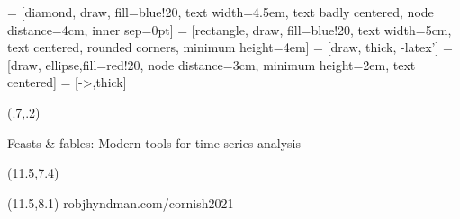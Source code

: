 
\usepackage{bm,booktabs,animate,ragged2e,multicol,microtype,hyperref,alltt}

\fontsize{13}{15}\sf
\usepackage[scale=0.85]{sourcecodepro}
\usepackage{fontawesome}

\usetikzlibrary{trees,shapes,arrows,matrix}
 = [diamond, draw, fill=blue!20,
    text width=4.5em, text badly centered, node distance=4cm, inner sep=0pt]
 = [rectangle, draw, fill=blue!20,
    text width=5cm, text centered, rounded corners, minimum height=4em]
 = [draw, thick, -latex']
 = [draw, ellipse,fill=red!20, node distance=3cm,
    minimum height=2em, text centered]
 = [->,thick]

\graphicspath{{figs/}}

{
\begin{textblock}{12.5}(.7,.2)\fontsize{18}{20}\sf
{\color{MonashBlue}\raggedright{}\par Feasts \& fables: Modern tools for time series analysis}
\end{textblock}
\begin{textblock}{7.5}(11.5,7.4)
{\fontsize{15}{15}\sf\color[RGB]{45,27,15}\bfseries\raggedright{\insertauthor}}
\end{textblock}
\begin{textblock}{7.5}(11.5,8.1)
{\fontsize{9}{9}\sf\color[RGB]{45,27,15}robjhyndman.com/cornish2021}
\end{textblock}
}

\def\E{\text{E}}
\def\V{\text{Var}}
\def\bY{\bm{y}}
\def\by{\bm{y}}
\def\bS{\bm{S}}
\def\bG{\bm{G}}
\def\bW{\bm{W}}
\def\bSigma{\bm{\Sigma}}
\def\Var{\text{Var}}
\def\var{\text{Var}}
\newcommand{\btwocol}{\begin{multicols}{2}}
\newcommand{\etwocol}{\end{multicols}}
\def\pred#1#2#3{\hat{#1}_{#2|#3}}
\def\damped{$_\text{d}$}

\def\forecast{\begin{alertblock}{}\fontsize{10}{11}\sf
A forecast is an estimate of the probability distribution of a variable to be observed in the future.
\end{alertblock}}
\def\simfutures{\begin{textblock}{2.7}(13,7.7)
\begin{block}{}\fontsize{10}{11}\sf
Simulated futures from an ETS model
\end{block}\end{textblock}}

